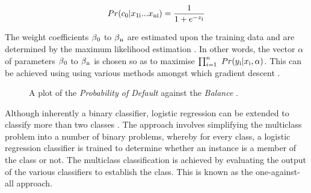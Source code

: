 \documentclass{article}[paper=a4,pagesize=auto,10pt]
\begin{document}
\begin{equation}\label{eq:logistic2}
	Pr(c\textsubscript{0}|x\textsubscript{1i}...x\textsubscript{ni}) = \frac{1}{1 + e^{-z\textsubscript{i}}}
\end{equation}\smallskip

The weight coefficients $\beta\textsubscript{0}$ to $\beta\textsubscript{n}$ are estimated upon the training data and are determined by the maximum likelihood estimation \cite{james2013introduction,dreiseitl2002logistic}. In other words, the vector $\alpha$ of parameters $\beta\textsubscript{0}$ to $\beta\textsubscript{n}$ is chosen so as to maximise $\prod_{i=1}^{n}\ Pr(y\textsubscript{i}|x\textsubscript{i},\alpha)$. This can be achieved using using various methods amongst which gradient descent \cite{dreiseitl2002logistic}.\medskip

\begin{figure}[!ht]
    \centering
    \qquad
    \caption[Short Caption]{A plot of the \textit{Probability of Default} against the \textit{Balance} \cite{james2013introduction}.}        
    \label{fig:logistic_graph}
\end{figure}

Although inherently a binary classifier, logistic regression can be extended to classify more than two classes \cite{allwein2000reducing}. The approach involves simplifying the multiclass problem into a number of binary problems, whereby for every class, a logistic regression classifier is trained to determine whether an instance is a member of the class or not.  The multiclass classification is achieved by evaluating the output of the various classifiers to establish the class.  This is known as the one-against-all approach.\medskip
\end{document}
